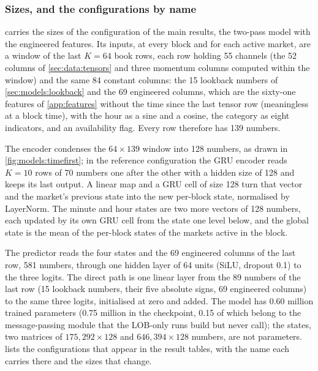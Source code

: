 \subsubsection{Sizes, and the configurations by name}
\label{sec:models:sizes}

 carries the sizes of the configuration of the main results,
the two-pass model with the engineered features.  Its inputs, at every block and for each
active market, are a window of the last $K = 64$ book rows, each row holding 55 channels
(the 52 columns of \cref{sec:data:tensors} and three momentum columns computed within the
window) and the same 84 constant columns: the 15 lookback numbers of
\cref{sec:models:lookback} and the 69 engineered columns, which are the sixty-one features
of \cref{app:features} without the time since the last tensor row (meaningless at a block
time), with the hour as a sine and a cosine, the category as eight indicators, and an
availability flag.  Every row therefore has 139 numbers.

The encoder condenses the $64 \times 139$ window into 128 numbers, as drawn in
\cref{fig:models:timefirst}; in the reference configuration the GRU encoder reads $K = 10$
rows of 70 numbers one after the other with a hidden size of 128 and keeps its last
output.  A linear map and a GRU cell of size 128 turn that vector and the market's
previous state into the new per-block state, normalised by LayerNorm.  The minute and hour
states are two more vectors of 128 numbers, each updated by its own GRU cell from the state
one level below, and the global state is the mean of the per-block states of the markets
active in the block.

The predictor reads the four states and the 69 engineered columns of the last row, 581
numbers, through one hidden layer of 64 units (SiLU, dropout 0.1) to the three logits.  The
direct path is one linear layer from the 89 numbers of the last row (15 lookback numbers,
their five absolute signs, 69 engineered columns) to the same three logits, initialised at
zero and added.  The model has 0.60 million trained parameters (0.75 million in the
checkpoint, 0.15 of which belong to the message-passing module that the LOB-only runs build
but never call); the states, two matrices of $175{,}292 \times 128$ and $646{,}394 \times
128$ numbers, are not parameters.   lists the configurations
that appear in the result tables, with the name each carries there and the sizes that
change.

